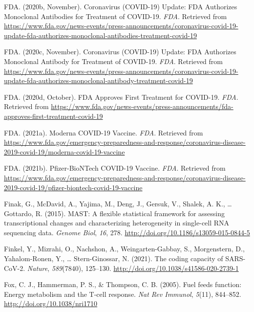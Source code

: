 \documentclass[12pt,twoside,openany,\mydriver]{thesis}  %
\begin{document}
\leavevmode\hypertarget{ref-fda_coronavirus_2020-2}{}%
FDA. (2020b, November). Coronavirus (COVID-19) Update: FDA Authorizes Monoclonal Antibodies for Treatment of COVID-19. \emph{FDA}. Retrieved from \url{https://www.fda.gov/news-events/press-announcements/coronavirus-covid-19-update-fda-authorizes-monoclonal-antibodies-treatment-covid-19}

\leavevmode\hypertarget{ref-fda_coronavirus_2020-1}{}%
FDA. (2020c, November). Coronavirus (COVID-19) Update: FDA Authorizes Monoclonal Antibody for Treatment of COVID-19. \emph{FDA}. Retrieved from \url{https://www.fda.gov/news-events/press-announcements/coronavirus-covid-19-update-fda-authorizes-monoclonal-antibody-treatment-covid-19}

\leavevmode\hypertarget{ref-fda_fda_2020}{}%
FDA. (2020d, October). FDA Approves First Treatment for COVID-19. \emph{FDA}. Retrieved from \url{https://www.fda.gov/news-events/press-announcements/fda-approves-first-treatment-covid-19}

\leavevmode\hypertarget{ref-fda_moderna_2021}{}%
FDA. (2021a). Moderna COVID-19 Vaccine. \emph{FDA}. Retrieved from \url{https://www.fda.gov/emergency-preparedness-and-response/coronavirus-disease-2019-covid-19/moderna-covid-19-vaccine}

\leavevmode\hypertarget{ref-fda_pfizer-biontech_2021}{}%
FDA. (2021b). Pfizer-BioNTech COVID-19 Vaccine. \emph{FDA}. Retrieved from \url{https://www.fda.gov/emergency-preparedness-and-response/coronavirus-disease-2019-covid-19/pfizer-biontech-covid-19-vaccine}

\leavevmode\hypertarget{ref-finak_mast_2015}{}%
Finak, G., McDavid, A., Yajima, M., Deng, J., Gersuk, V., Shalek, A. K., \ldots{} Gottardo, R. (2015). MAST: A flexible statistical framework for assessing transcriptional changes and characterizing heterogeneity in single-cell RNA sequencing data. \emph{Genome Biol}, \emph{16}, 278. \url{http://doi.org/10.1186/s13059-015-0844-5}

\leavevmode\hypertarget{ref-finkel_coding_2021}{}%
Finkel, Y., Mizrahi, O., Nachshon, A., Weingarten-Gabbay, S., Morgenstern, D., Yahalom-Ronen, Y., \ldots{} Stern-Ginossar, N. (2021). The coding capacity of SARS-CoV-2. \emph{Nature}, \emph{589}(7840), 125--130. \url{http://doi.org/10.1038/s41586-020-2739-1}

\leavevmode\hypertarget{ref-fox_fuel_2005}{}%
Fox, C. J., Hammerman, P. S., \& Thompson, C. B. (2005). Fuel feeds function: Energy metabolism and the T-cell response. \emph{Nat Rev Immunol}, \emph{5}(11), 844--852. \url{http://doi.org/10.1038/nri1710}
\end{document}
